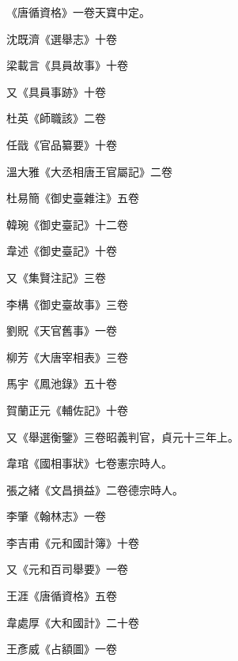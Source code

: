\begin{pinyinscope}
 《唐循資格》一卷天寶中定。



 沈既濟《選舉志》十卷



 梁載言《具員故事》十卷



 又《具員事跡》十卷



 杜英《師職該》二卷



 任戩《官品纂要》十卷



 溫大雅《大丞相唐王官屬記》二卷



 杜易簡《御史臺雜注》五卷



 韓琬《御史臺記》十二卷



 韋述《御史臺記》十卷



 又《集賢注記》三卷



 李構《御史臺故事》三卷



 劉貺《天官舊事》一卷



 柳芳《大唐宰相表》三卷



 馬宇《鳳池錄》五十卷



 賀蘭正元《輔佐記》十卷



 又《舉選衡鑒》三卷昭義判官，貞元十三年上。



 韋琯《國相事狀》七卷憲宗時人。



 張之緒《文昌損益》二卷德宗時人。



 李肇《翰林志》一卷



 李吉甫《元和國計簿》十卷



 又《元和百司舉要》一卷



 王涯《唐循資格》五卷



 韋處厚《大和國計》二十卷



 王彥威《占額圖》一卷




\end{pinyinscope}
